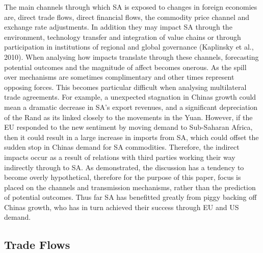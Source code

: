\documentclass[11pt,preprint, authoryear]{elsarticle}
\numberwithin{equation}{section}
\numberwithin{figure}{section}
\numberwithin{table}{section}
\begin{document}
The main channels through which SA is exposed to changes in foreign
economies are, direct trade flows, direct financial flows, the commodity
price channel and exchange rate adjustments. In addition they may impact
SA through the environment, technology transfer and integration of value
chains or through participation in institutions of regional and global
governance (Kaplinsky et al., 2010). When analysing how impacts
translate through these channels, forecasting potential outcomes and the
magnitude of affect becomes onerous. As the spill over mechanisms are
sometimes complimentary and other times represent opposing forces. This
becomes particular difficult when analysing multilateral trade
agreements. For example, a unexpected stagnation in Chinas growth could
mean a dramatic decrease in SA's export revenues, and a significant
depreciation of the Rand as its linked closely to the movements in the
Yuan. However, if the EU responded to the new sentiment by moving demand
to Sub-Saharan Africa, then it could result in a large increase in
imports from SA, which could offset the sudden stop in Chinas demand for
SA commodities. Therefore, the indirect impacts occur as a result of
relations with third parties working their way indirectly through to SA.
As demonstrated, the discussion has a tendency to become overly
hypothetical, therefore for the purpose of this paper, focus is placed
on the channels and transmission mechanisms, rather than the prediction
of potential outcomes. Thus far SA has benefitted greatly from piggy
backing off Chinas growth, who has in turn achieved their success
through EU and US demand.

\hypertarget{trade-flows}{%
\subsection{Trade Flows}\label{trade-flows}}
\end{document}
